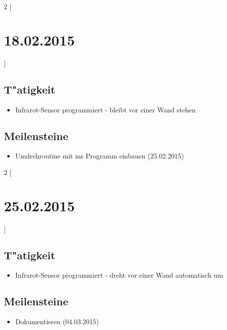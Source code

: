 \documentclass[11pt,a4paper]{article}
\begin{document}
\begin{multicols}{2}
[\section*{  18.02.2015  }] 

\subsection*{T"atigkeit}
\begin{itemize}
\item Infrarot-Sensor programmiert - bleibt vor einer Wand stehen
\end{itemize}

\columnbreak

\subsection*{Meilensteine}

\begin{itemize}
\item Umdrehroutine mit ins Programm einbauen (25.02.2015)
\end{itemize}

\end{multicols}


\begin{multicols}{2}
[\section*{  25.02.2015  }] 

\subsection*{T"atigkeit}
\begin{itemize}
\item Infrarot-Sensor programmiert - dreht vor einer Wand automatisch um
\end{itemize}

\columnbreak

\subsection*{Meilensteine}

\begin{itemize}
\item Dokumentieren (04.03.2015)
\end{itemize}

\end{multicols}
\end{document}
